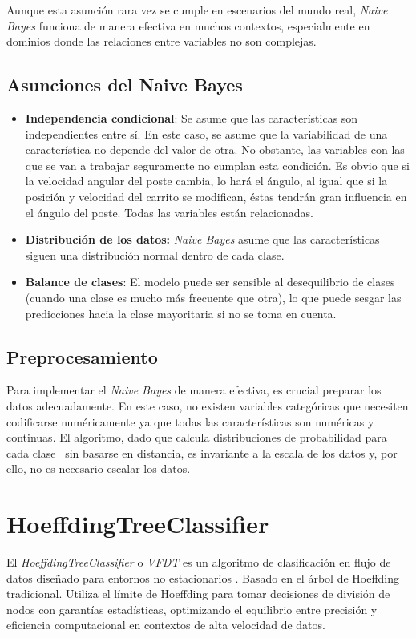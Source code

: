 \documentclass[12pt,letterpaper]{article}
\begin{document}
Aunque esta asunción rara vez se cumple en escenarios del mundo real, \textit{Naive Bayes} funciona de manera efectiva en muchos contextos, especialmente en dominios donde las relaciones entre variables no son complejas.

\subsection{Asunciones del Naive Bayes}
\begin{itemize}
    \item \textbf{Independencia condicional}: Se asume que las características son independientes entre sí.
          En este caso, se asume que la variabilidad de una característica no depende del valor de otra. No obstante, las variables con las que se van a trabajar seguramente no cumplan esta condición. Es obvio que si la velocidad angular del poste cambia, lo hará el ángulo, al igual que si la posición y velocidad del carrito se modifican, éstas tendrán gran influencia en el ángulo del poste. Todas las variables están relacionadas.
    \item \textbf{Distribución de los datos:} \textit{Naive Bayes} asume que las características siguen una distribución normal dentro de cada clase.
    \item \textbf{Balance de clases}: El modelo puede ser sensible al desequilibrio de clases (cuando una clase es mucho más frecuente que otra), lo que puede sesgar las predicciones hacia la clase mayoritaria si no se toma en cuenta.
\end{itemize}

\subsection{Preprocesamiento}
Para implementar el \textit{Naive Bayes} de manera efectiva, es crucial preparar los datos adecuadamente.
En este caso, no existen variables categóricas que necesiten codificarse numéricamente ya que todas las características son numéricas y continuas.
El algoritmo, dado que calcula distribuciones de probabilidad para cada clase~\cite{NaiveBayes} sin basarse en distancia, es invariante a la escala de los datos y, por ello, no es necesario escalar los datos.

\section{HoeffdingTreeClassifier}
El \textit{HoeffdingTreeClassifier} o \textit{VFDT} es un algoritmo de clasificación en flujo de datos diseñado para entornos no estacionarios \cite{Domingos2000}. Basado en el árbol de Hoeffding tradicional. Utiliza el límite de Hoeffding para tomar decisiones de división de nodos con garantías estadísticas, optimizando el equilibrio entre precisión y eficiencia computacional en contextos de alta velocidad de datos.
\end{document}

